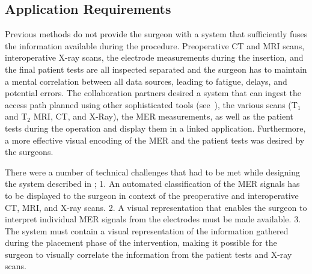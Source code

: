 \subsection{Application Requirements} \label{contributions:dbs:requirements}
Previous methods do not provide the surgeon with a system that sufficiently fuses the information available during the procedure.  Preoperative CT and MRI scans, interoperative X-ray scans, the electrode measurements during the insertion, and the final patient tests are all inspected separated and the surgeon has to maintain a mental correlation between all data sources, leading to fatigue, delays, and potential errors.  The collaboration partners desired a system that can ingest the access path planned using other sophisticated tools (see~), the various scans (T$_1$ and T$_2$ MRI, CT, and X-Ray), the MER measurements, as well as the patient tests during the operation and display them in a linked application.  Furthermore, a more effective visual encoding of the MER and the patient tests was desired by the surgeons.

There were a number of technical challenges that had to be met while designing the system described in ;  1. An automated classification of the MER signals has to be displayed to the surgeon in context of the preoperative and interoperative CT, MRI, and X-ray scans.  2. A visual representation that enables the surgeon to interpret individual MER signals from the electrodes must be made available.  3. The system must contain a visual representation of the information gathered during the placement phase of the intervention, making it possible for the surgeon to visually correlate the information from the patient tests and X-ray scans.





